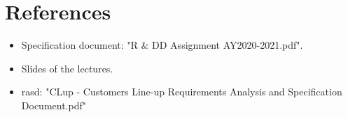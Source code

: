 \chapter{References}

\begin{itemize}
	\item Specification document: "R \& DD Assignment AY2020-2021.pdf".
	\item Slides of the lectures.
	\item \gls{rasd}: "CLup - Customers Line-up Requirements Analysis and Specification Document.pdf"
\end{itemize}